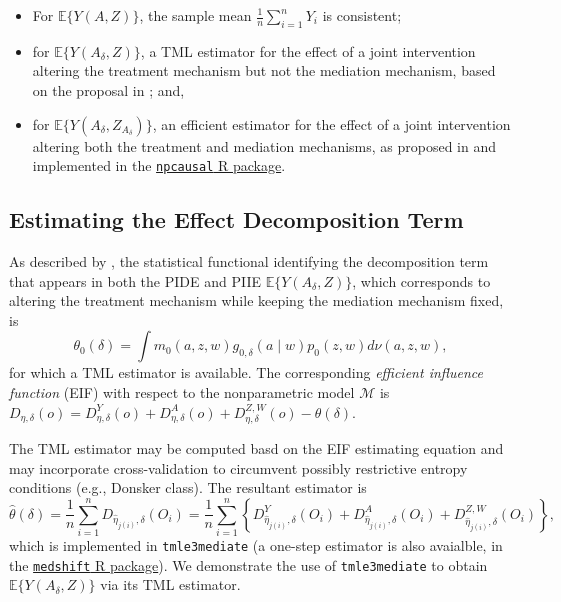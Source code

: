 \documentclass[
  12pt, krantz2,
]{krantz}
\newcommand{\passthrough}[1]{#1}
\providecommand{\tightlist}{%
  \setlength{\itemsep}{0pt}\setlength{\parskip}{0pt}}
\newcommand{\1}{\mathbbm{1}}
\theoremstyle{definition}
\theoremstyle{definition}
\theoremstyle{definition}
\theoremstyle{definition}
\theoremstyle{remark}
\begin{document}
\begin{itemize}
\tightlist
\item
  For \(\mathbb{E}\{Y(A, Z)\}\), the sample mean \(\frac{1}{n}\sum_{i=1}^n Y_i\) is
  consistent;
\item
  for \(\mathbb{E}\{Y(A_{\delta}, Z)\}\), a TML estimator for the effect of a
  joint intervention altering the treatment mechanism but not the mediation
  mechanism, based on the proposal in \citet{diaz2020causal}; and,
\item
  for \(\mathbb{E}\{Y(A_{\delta}, Z_{A_{\delta}})\}\), an efficient estimator for
  the effect of a joint intervention altering both the treatment and mediation
  mechanisms, as proposed in \citet{kennedy2019nonparametric} and implemented in the
  \href{https://github.com/ehkennedy/npcausal}{\passthrough{\lstinline!npcausal!} R package}.
\end{itemize}

\hypertarget{estimating-the-effect-decomposition-term}{%
\subsection{Estimating the Effect Decomposition Term}\label{estimating-the-effect-decomposition-term}}

As described by \citet{diaz2020causal}, the statistical functional identifying the
decomposition term that appears in both the PIDE and PIIE
\(\mathbb{E}\{Y(A_{\delta}, Z)\}\), which corresponds to altering the treatment
mechanism while keeping the mediation mechanism fixed, is
\begin{equation*}
  \theta_0(\delta) = \int m_0(a, z, w) g_{0,\delta}(a \mid w) p_0(z, w)
    d\nu(a, z, w),
\end{equation*}
for which a TML estimator is available. The corresponding \emph{efficient influence
function} (EIF) with respect to the nonparametric model \(\mathcal{M}\) is
\(D_{\eta,\delta}(o) = D^Y_{\eta,\delta}(o) + D^A_{\eta,\delta}(o) + D^{Z,W}_{\eta,\delta}(o) - \theta(\delta)\).

The TML estimator may be computed basd on the EIF estimating equation and may
incorporate cross-validation \citep{zheng2011cross, chernozhukov2018double} to
circumvent possibly restrictive entropy conditions (e.g., Donsker class). The
resultant estimator is
\begin{equation*}
  \hat{\theta}(\delta) = \frac{1}{n} \sum_{i = 1}^n D_{\hat{\eta}_{j(i)},
  \delta}(O_i) = \frac{1}{n} \sum_{i = 1}^n \left\{ D^Y_{\hat{\eta}_{j(i)},
  \delta}(O_i) + D^A_{\hat{\eta}_{j(i)}, \delta}(O_i) +
  D^{Z,W}_{\hat{\eta}_{j(i)}, \delta}(O_i) \right\},
\end{equation*}
which is implemented in \passthrough{\lstinline!tmle3mediate!} (a one-step estimator is also avaialble,
in the \href{https://github.com/nhejazi/medshift}{\passthrough{\lstinline!medshift!} R package}). We
demonstrate the use of \passthrough{\lstinline!tmle3mediate!} to obtain \(\mathbb{E}\{Y(A_{\delta}, Z)\}\)
via its TML estimator.
\end{document}
